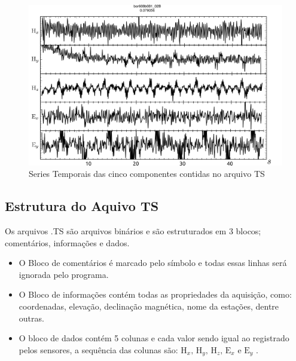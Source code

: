         \begin{figure}[H]
            \centering
	        \caption{Series Temporais das cinco componentes contidas no arquivo TS}
	        \begin{center}
	        \includegraphics[width=16cm]{texto/fig/campos_divididos.png} 
	        \end{center}
	    \end{figure}
        
        \subsection{Estrutura do Aquivo TS}
            \label{subsec-arquivoTS}    
            Os arquivos .TS são arquivos binários e são estruturados em 3 blocos; comentários, informações e dados.
            \begin{itemize}
             \item O Bloco de comentários é marcado pelo símbolo \en{\#} e todas essas linhas será ignorada pelo programa.
             \item   O Bloco de informações contém todas as propriedades da aquisição, como: coordenadas, elevação, declinação magnética, nome da estações, dentre outras.
             \item O bloco de dados contém 5 colunas e cada valor sendo igual ao registrado pelos sensores, a sequência das colunas são: $\textrm{H}_x,\, \textrm{H}_y, \, \textrm{H}_z, \, \textrm{E}_x \, \, \textrm{e} \, \, \textrm{E}_y$ \cite{tsformat}.
            \end{itemize}


